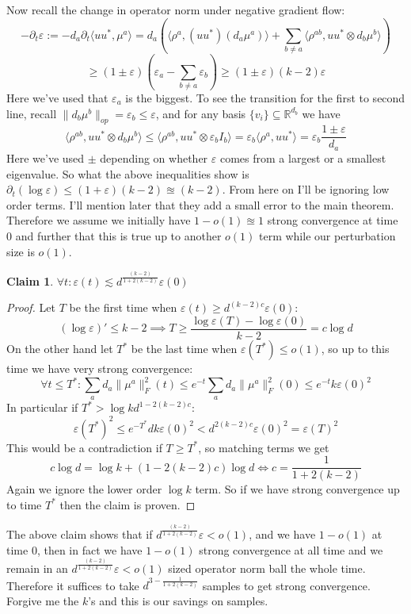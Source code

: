 \documentclass{article}
\newtheorem{claim}[theorem]{Claim}
\newcommand{\R}{{\mathbb{R}}}
\newcommand\eps{\varepsilon}
\begin{document}
Now recall the change in operator norm under negative gradient flow:
\[ -\partial_{t} \eps := - d_{a} \partial_{t} \langle u u^{*}, \mu^{a} \rangle = d_{a} \left(\langle \rho^{a}, (u u^{*}) (d_{a} \mu^{a}) \rangle + \sum_{b \neq a} \langle \rho^{ab}, u u^{*} \otimes d_{b} \mu^{b} \rangle \right)   \]
\[ \geq (1 \pm \eps) \left( \eps_{a} - \sum_{b \neq a} \eps_{b} \right) \geq (1 \pm \eps) (k-2) \eps    \]
Here we've used that $\eps_{a}$ is the biggest. To see the transition for the first to second line, recall $\|d_{b} \mu^{b}\|_{op} = \eps_{b} \leq \eps$, and for any basis $\{v_{i}\} \subseteq \R^{d_{b}}$ we have
\[ \langle \rho^{ab}, u u^{*} \otimes d_{b} \mu^{b} \rangle \leq \langle \rho^{ab}, u u^{*} \otimes \eps_{b} I_{b} \rangle = \eps_{b} \langle \rho^{a}, u u^{*} \rangle = \eps_{b} \frac{1 \pm \eps}{d_{a}}    \]
Here we've used $\pm$ depending on whether $\eps$ comes from a largest or a smallest eigenvalue. So what the above inequalities show is $\partial_{t} (\log \eps) \leq (1+\eps) (k-2) \approxeq (k-2)$. From here on I'll be ignoring low order terms. I'll mention later that they add a small error to the main theorem. Therefore we assume we initially have $1-o(1) \approxeq 1$ strong convergence at time $0$ and further that this is true up to another $o(1)$ term while our perturbation size is $o(1)$. 

\begin{claim}
$\forall t: \eps(t) \lesssim d^{\frac{(k-2)}{1 + 2(k-2)}} \eps(0)$
\end{claim}
\begin{proof}
Let $T$ be the first time when $\eps(t) \geq d^{(k-2) c} \eps(0)$: 
\[ (\log \eps)' \leq k-2 \implies T \geq \frac{\log \eps(T) - \log \eps(0)}{k-2} = c \log d  \]
On the other hand let $T^{*}$ be the last time when $\eps(T^{*}) \leq o(1)$, so up to this time we have very strong convergence:
\[ \forall t \leq T^{*}: \sum_{a} d_{a} \|\mu^{a}\|_{F}^{2} (t) \leq e^{-t} \sum_{a} d_{a} \|\mu^{a}\|_{F}^{2} (0) \leq e^{-t} k \eps(0)^{2}    \]
In particular if $T^{*} > \log k d^{1 - 2(k-2)c}$:
\[ \eps(T^{*})^{2} \leq e^{-T^{*}} d k \eps(0)^{2} < d^{2(k-2)c} \eps(0)^{2} = \eps(T)^{2}    \]
This would be a contradiction if $T \geq T^{*}$, so matching terms we get
\[ c \log d = \log k + (1 - 2(k-2)c) \log d \iff c = \frac{1}{1 + 2(k-2)}     \]
Again we ignore the lower order $\log k$ term. So if we have strong convergence up to time $T^{*}$ then the claim is proven. 
\end{proof}

The above claim shows that if $d^{\frac{(k-2)}{1 + 2(k-2)}} \eps < o(1)$, and we have $1-o(1)$ at time $0$, then in fact we have $1-o(1)$ strong convergence at all time and we remain in an $d^{\frac{(k-2)}{1 + 2(k-2)}} \eps < o(1)$ sized operator norm ball the whole time. Therefore it suffices to take $d^{3 - \frac{1}{1 + 2(k-2)}}$ samples to get strong convergence. Forgive me the $k$'s and this is our savings on samples. 
\end{document}
